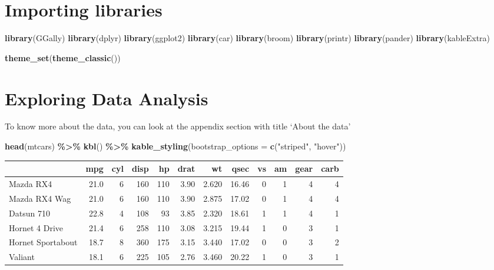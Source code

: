 \documentclass[
]{article}
\newenvironment{Shaded}{\begin{snugshade}}{\end{snugshade}}
\newcommand{\AttributeTok}[1]{\textcolor[rgb]{0.13,0.29,0.53}{#1}}
\newcommand{\FunctionTok}[1]{\textcolor[rgb]{0.13,0.29,0.53}{\textbf{#1}}}
\newcommand{\NormalTok}[1]{#1}
\newcommand{\SpecialCharTok}[1]{\textcolor[rgb]{0.81,0.36,0.00}{\textbf{#1}}}
\newcommand{\StringTok}[1]{\textcolor[rgb]{0.31,0.60,0.02}{#1}}
\begin{document}
\section{Importing libraries}\label{importing-libraries}

\begin{Shaded}
\begin{Highlighting}[]
\FunctionTok{library}\NormalTok{(GGally)}
\FunctionTok{library}\NormalTok{(dplyr)}
\FunctionTok{library}\NormalTok{(ggplot2)}
\FunctionTok{library}\NormalTok{(car)}
\FunctionTok{library}\NormalTok{(broom)}
\FunctionTok{library}\NormalTok{(printr)}
\FunctionTok{library}\NormalTok{(pander)}
\FunctionTok{library}\NormalTok{(kableExtra)}

\FunctionTok{theme\_set}\NormalTok{(}\FunctionTok{theme\_classic}\NormalTok{())}
\end{Highlighting}
\end{Shaded}

\section{Exploring Data Analysis}\label{exploring-data-analysis}

To know more about the data, you can look at the appendix section with
title `About the data'

\begin{Shaded}
\begin{Highlighting}[]
\FunctionTok{head}\NormalTok{(mtcars) }\SpecialCharTok{\%\textgreater{}\%} \FunctionTok{kbl}\NormalTok{() }\SpecialCharTok{\%\textgreater{}\%} \FunctionTok{kable\_styling}\NormalTok{(}\AttributeTok{bootstrap\_options =} \FunctionTok{c}\NormalTok{(}\StringTok{"striped"}\NormalTok{, }\StringTok{"hover"}\NormalTok{))}
\end{Highlighting}
\end{Shaded}

\begin{table}
\centering
\begin{tabular}[t]{l|r|r|r|r|r|r|r|r|r|r|r}
\hline
  & mpg & cyl & disp & hp & drat & wt & qsec & vs & am & gear & carb\\
\hline
Mazda RX4 & 21.0 & 6 & 160 & 110 & 3.90 & 2.620 & 16.46 & 0 & 1 & 4 & 4\\
\hline
Mazda RX4 Wag & 21.0 & 6 & 160 & 110 & 3.90 & 2.875 & 17.02 & 0 & 1 & 4 & 4\\
\hline
Datsun 710 & 22.8 & 4 & 108 & 93 & 3.85 & 2.320 & 18.61 & 1 & 1 & 4 & 1\\
\hline
Hornet 4 Drive & 21.4 & 6 & 258 & 110 & 3.08 & 3.215 & 19.44 & 1 & 0 & 3 & 1\\
\hline
Hornet Sportabout & 18.7 & 8 & 360 & 175 & 3.15 & 3.440 & 17.02 & 0 & 0 & 3 & 2\\
\hline
Valiant & 18.1 & 6 & 225 & 105 & 2.76 & 3.460 & 20.22 & 1 & 0 & 3 & 1\\
\hline
\end{tabular}
\end{table}
\end{document}
